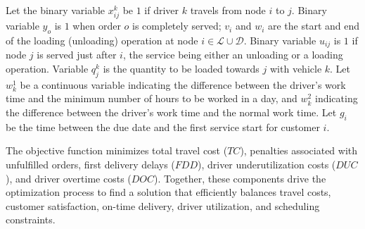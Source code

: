 Let the binary variable $x^{k}_{ij}$ be $1$ if driver $k$ travels from node $i$ to $j$. Binary variable $y_o$ is $1$ when order $o$ is completely served; $v_i$ and $w_i$ are the start and end of the loading (unloading) operation at node $i \in \mathcal{L}\cup \mathcal{D}$. Binary variable $u_{ij}$ is $1$ if node $j$ is served just after $i$, the service being either an unloading or a loading operation. %
Variable $q^k_j$ is the quantity to be loaded towards $j$ with vehicle $k$. Let $w^1_k$ be a continuous variable indicating the difference between the driver's work time and the minimum number of hours to be worked in a day, and $w^2_k$ indicating the difference between the driver's work time and the normal work time. Let $g_i$ be the time between the due date and the first service start for customer $i$.

The objective function minimizes total travel cost ($TC$), penalties associated with unfulfilled orders, first delivery delays ($FDD$), driver underutilization costs ($DUC$), and driver overtime costs ($DOC$). Together, these components drive the optimization process to find a solution that efficiently balances travel costs, customer satisfaction, on-time delivery, driver utilization, and scheduling constraints.

